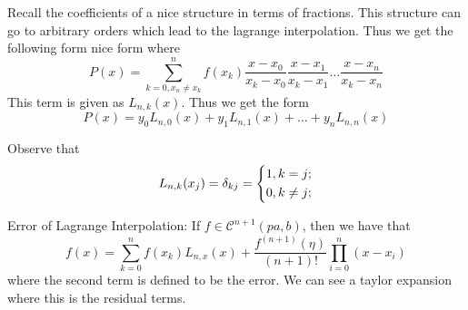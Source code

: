 \begin{remark}
    Recall the coefficients of a nice structure in terms of fractions. This structure can go to arbitrary orders which lead to the lagrange interpolation.
    Thus we get the following form nice form where
    \[
        P(x) = \sum_{k=0, x_n \neq x_k}^n f(x_k)  \frac{x-x_0}{x_k - x_0}\frac{x-x_1}{x_k - x_1} \dots \frac{x - x_n}{x_k - x_n} 
    \]
    This term is given as \(L_{n,k} (x)\). Thus we get the form
    \[
        P(x) = y_0 L_{n,0} (x) + y_1 L_{n,1} (x) + \dots + y_n L_{n,n}(x) 
    \]
\end{remark}
Observe that 
\[
    L_{n,k} (x_j) = \delta_{kj} = \begin{dcases}
        1, k = j ;\\
        0, k \neq j  ;\\
    \end{dcases}
\]

\begin{theorem}
    Error of Lagrange Interpolation:
    If \(f \in \mathcal{C}^{n+1} (pa,b)  \), then we have that 
    \[
        f(x) = \sum_{k=0}^n f(x_k) L_{n,x} (x) + \frac{f^{(n+1)} (\eta)}{(n+1)!} \prod_{i=0}^n (x-x_i)
    \] 
    where the second term is defined to be the error. We can see a taylor expansion where this is the residual terms.
\end{theorem}